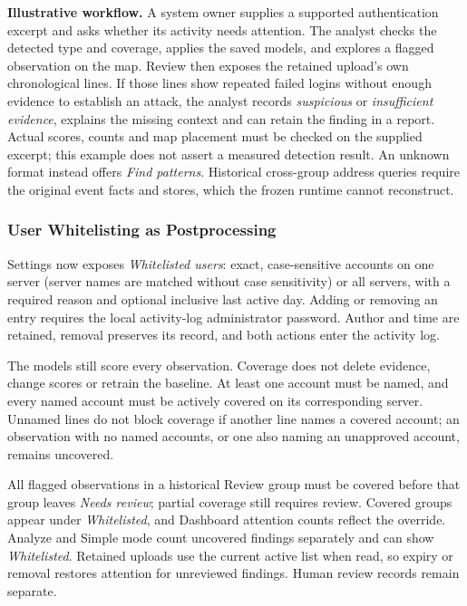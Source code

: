 \documentclass[11pt,a4paper]{article}
\begin{document}
\textbf{Illustrative workflow.} A system owner supplies a supported authentication excerpt and asks whether its activity needs attention. The analyst checks the detected type and coverage, applies the saved models, and explores a flagged observation on the map. Review then exposes the retained upload's own chronological lines. If those lines show repeated failed logins without enough evidence to establish an attack, the analyst records \emph{suspicious} or \emph{insufficient evidence}, explains the missing context and can retain the finding in a report. Actual scores, counts and map placement must be checked on the supplied excerpt; this example does not assert a measured detection result. An unknown format instead offers \emph{Find patterns}. Historical cross-group address queries require the original event facts and stores, which the frozen runtime cannot reconstruct.

\subsubsection{User Whitelisting as Postprocessing}\label{sec:whitelist}

Settings now exposes \emph{Whitelisted users}: exact, case-sensitive accounts on one server (server names are matched without case sensitivity) or all servers, with a required reason and optional inclusive last active day. Adding or removing an entry requires the local activity-log administrator password. Author and time are retained, removal preserves its record, and both actions enter the activity log.

The models still score every observation. Coverage does not delete evidence, change scores or retrain the baseline. At least one account must be named, and every named account must be actively covered on its corresponding server. Unnamed lines do not block coverage if another line names a covered account; an observation with no named accounts, or one also naming an unapproved account, remains uncovered.

All flagged observations in a historical Review group must be covered before that group leaves \emph{Needs review}; partial coverage still requires review. Covered groups appear under \emph{Whitelisted}, and Dashboard attention counts reflect the override. Analyze and Simple mode count uncovered findings separately and can show \emph{Whitelisted}. Retained uploads use the current active list when read, so expiry or removal restores attention for unreviewed findings. Human review records remain separate.
\end{document}
